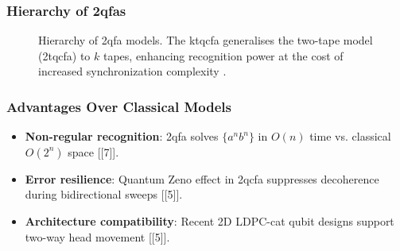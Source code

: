 \subsubsection*{Hierarchy of \glspl{2qfa}}
\label{subsec:two-way-hierarchy}
\begin{figure}[ht]
\centering
{}
\caption{Hierarchy of \gls{2qfa} models. The \gls{ktqcfa} generalises the two-tape model (\gls{2tqcfa}) to \( k \) tapes, enhancing recognition power at the cost of increased synchronization complexity \cite{gruska2005}.}
\label{fig:two-way-hierarchy}
\end{figure}


\subsubsection*{Advantages Over Classical Models}\label{subsec:classical-advantages}
\begin{itemize}
    \item \textbf{Non-regular recognition}: \gls{2qfa} solves \(\{a^n b^n\}\) in \(O(n)\) time vs. classical \(O(2^n)\) space [[7]]. %
    \item \textbf{Error resilience}: Quantum Zeno effect in \gls{2qcfa} suppresses decoherence during bidirectional sweeps [[5]]. %
    \item \textbf{Architecture compatibility}: Recent 2D LDPC-cat qubit designs support two-way head movement [[5]]. %
\end{itemize}
